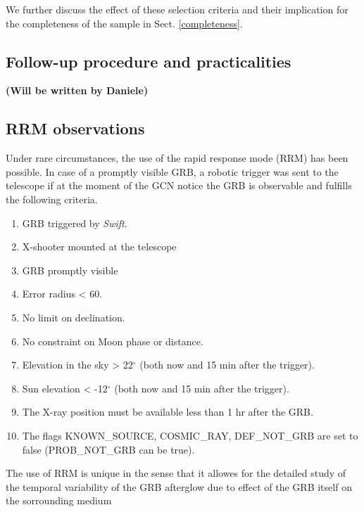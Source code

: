 \documentclass{aa}    %
\newcommand\todo[1]{\textbf{(#1)}}
\begin{document}
We further discuss the effect of these selection criteria and their implication
for the completeness of the sample in Sect. \ref{completeness}.

\subsection{Follow-up procedure and practicalities}

\todo{Will be written by Daniele}



\subsection{RRM observations} \label{RRM}

Under rare circumstances, the use of the rapid response mode (RRM) has been
possible. In case of a promptly visible GRB, a robotic trigger was sent to
the telescope if at the moment of the GCN notice the GRB is observable and
fulfills the following criteria.


\begin{enumerate}
	\item GRB triggered by \textit{Swift}.
	\item X-shooter mounted at the telescope
	\item GRB promptly visible
	\item Error radius < 60\arcsec.
	\item No limit on declination. 
	\item No constraint on Moon phase or distance. 
	\item Elevation in the sky > 22$^\circ$ (both now and 15 min after the trigger).
	\item Sun elevation < -12$^\circ$ (both now and 15 min after the trigger).
	\item The X-ray position must be available less than 1 hr after the GRB.
	\item The flags KNOWN\_SOURCE, COSMIC\_RAY, DEF\_NOT\_GRB are set to false (PROB\_NOT\_GRB can be true).
\end{enumerate}

The use of RRM is unique in the sense that it allowes for the detailed study of
the temporal variability of the GRB afterglow due to effect of the GRB itself on
the sorrounding medium \citep[e.g., see][for examples]{Dessauges-Zavadsky2006,
	Vreeswijk2007, Vreeswijk2013}
\end{document}
